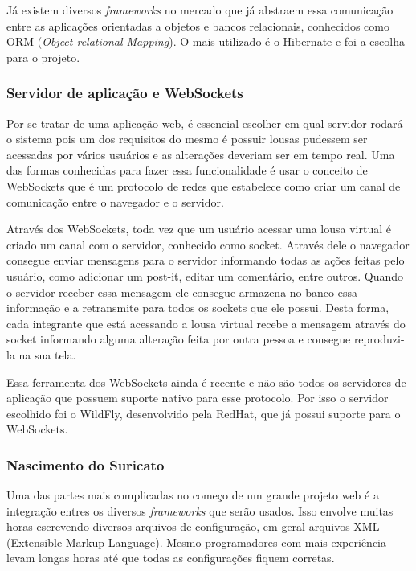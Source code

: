 Já existem diversos \textit{frameworks} no mercado que já abstraem essa comunicação entre as aplicações orientadas a objetos e bancos relacionais, conhecidos como ORM (\textit{Object-relational Mapping}). O mais utilizado é o Hibernate e foi a escolha para o projeto.

\subsubsection*{Servidor de aplicação e WebSockets}

Por se tratar de uma aplicação web, é essencial escolher em qual servidor rodará o sistema pois um dos requisitos do mesmo é possuir lousas pudessem ser acessadas por vários usuários e as alterações deveriam ser em tempo real. Uma das formas conhecidas para fazer essa funcionalidade é usar o conceito de WebSockets que é um protocolo de redes que estabelece como criar um canal de comunicação entre o navegador e o servidor.

Através dos WebSockets, toda vez que um usuário acessar uma lousa virtual é criado um canal com o servidor, conhecido como socket. Através dele o navegador consegue enviar mensagens para o servidor informando todas as ações feitas pelo usuário, como adicionar um post-it, editar um comentário, entre outros. Quando o servidor receber essa mensagem ele consegue armazena no banco essa informação e a retransmite para todos os sockets que ele possui. Desta forma, cada integrante que está acessando a lousa virtual recebe a mensagem através do socket informando alguma alteração feita por outra pessoa e consegue reproduzi-la na sua tela.

Essa ferramenta dos WebSockets ainda é recente e não são todos os servidores de aplicação que possuem suporte nativo para esse protocolo. Por isso o servidor escolhido foi o WildFly, desenvolvido pela RedHat, que já possui suporte para o WebSockets.

\subsubsection*{Nascimento do Suricato}

Uma das partes mais complicadas no começo de um grande projeto web é a integração entres os diversos \textit{frameworks} que serão usados. Isso envolve muitas horas escrevendo diversos arquivos de configuração, em geral arquivos XML (Extensible Markup Language). Mesmo programadores com mais experiência levam longas horas até que todas as configurações fiquem corretas. 
	
